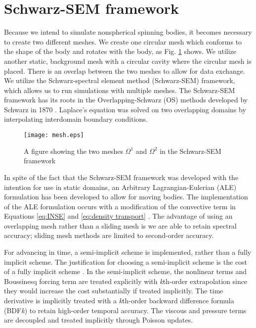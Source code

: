 \section{Schwarz-SEM framework}
\label{section:schwarz-SEM_framework}
Because we intend to simulate nonspherical spinning bodies, it becomes necessary to create two different meshes. We create one circular mesh which conforms to the shape of the body and rotates with the body, as Fig. \ref{fig:mesh} shows. We utilize another static, background mesh with a circular cavity where the circular mesh is placed. There is an overlap between the two meshes to allow for data exchange. We utilize the Schwarz-spectral element method (Schwarz-SEM) framework, which allows us to run simulations with multiple meshes. The Schwarz-SEM framework has its roots in the Overlapping-Schwarz (OS) methods developed by Schwarz in 1870 \cite{mittal_nonconforming_2019}. Laplace's equation was solved on two overlapping domains by interpolating interdomain boundary conditions.  

\begin{figure}\centerline{\texttt{[image: mesh.eps]}}
    \caption{A figure showing the two meshes $\Omega^1$ and $\Omega^2$ in the Schwarz-SEM framework}
    \label{fig:mesh}
\end{figure}

In spite of the fact that the Schwarz-SEM framework was developed with the intention for use in static domains, an Arbitrary Lagrangian-Eulerian (ALE) formulation has been developed to allow for moving bodies. The implementation of the ALE formulation occurs with a modification of the convective term in Equations \ref{eq:INSE} and \ref{eq:density transport} \cite{merrill_moving_2019}. The advantage of using an overlapping mesh rather than a sliding mesh is we are able to retain spectral accuracy; sliding mesh methods are limited to second-order accuracy.

For advancing in time, a semi-implicit scheme is implemented, rather than a fully implicit scheme. The justification for choosing a semi-implicit scheme is the cost of a fully implicit scheme \cite{tomboulides_numerical_1997}. In the semi-implicit scheme, the nonlinear terms and Boussinesq forcing term are treated explicitly with \textit{k}th-order extrapolation since they would increase the cost substantially if treated implicitly. The time derivative is implicitly treated with a \textit{k}th-order backward difference formula (BDF\textit{k}) to retain high-order temporal accuracy. The viscous and pressure terms are decoupled and treated implicitly through Poisson updates.

